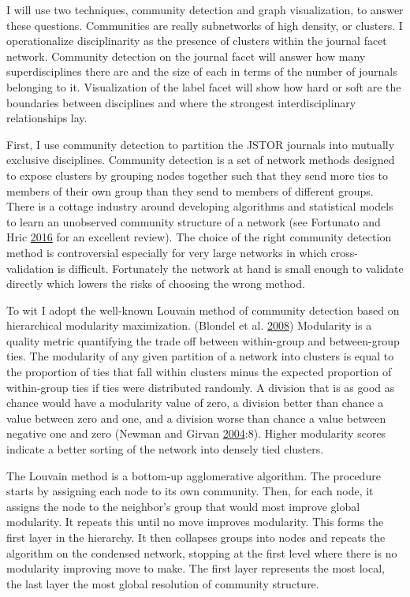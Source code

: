 \documentclass[]{book}
\theoremstyle{definition}
\theoremstyle{definition}
\theoremstyle{definition}
\theoremstyle{remark}
\begin{document}
I will use two techniques, community detection and graph visualization,
to answer these questions. Communities are really subnetworks of high
density, or clusters. I operationalize disciplinarity as the presence of
clusters within the journal facet network. Community detection on the
journal facet will answer how many superdisciplines there are and the
size of each in terms of the number of journals belonging to it.
Visualization of the label facet will show how hard or soft are the
boundaries between disciplines and where the strongest interdisciplinary
relationships lay.

First, I use community detection to partition the JSTOR journals into
mutually exclusive disciplines. Community detection is a set of network
methods designed to expose clusters by grouping nodes together such that
they send more ties to members of their own group than they send to
members of different groups. There is a cottage industry around
developing algorithms and statistical models to learn an unobserved
community structure of a network (see Fortunato and Hric
\protect\hyperlink{ref-Fortunato2016Community}{2016} for an excellent
review). The choice of the right community detection method is
controversial especially for very large networks in which
cross-validation is difficult. Fortunately the network at hand is small
enough to validate directly which lowers the risks of choosing the wrong
method.

To wit I adopt the well-known Louvain method of community detection
based on hierarchical modularity maximization. (Blondel et al.
\protect\hyperlink{ref-Blondel2008Fast}{2008}) Modularity is a quality
metric quantifying the trade off between within-group and between-group
ties. The modularity of any given partition of a network into clusters
is equal to the proportion of ties that fall within clusters minus the
expected proportion of within-group ties if ties were distributed
randomly. A division that is as good as chance would have a modularity
value of zero, a division better than chance a value between zero and
one, and a division worse than chance a value between negative one and
zero (Newman and Girvan
\protect\hyperlink{ref-Newman2004Finding}{2004}:8). Higher modularity
scores indicate a better sorting of the network into densely tied
clusters.

The Louvain method is a bottom-up agglomerative algorithm. The procedure
starts by assigning each node to its own community. Then, for each node,
it assigns the node to the neighbor's group that would most improve
global modularity. It repeats this until no move improves modularity.
This forms the first layer in the hierarchy. It then collapses groups
into nodes and repeats the algorithm on the condensed network, stopping
at the first level where there is no modularity improving move to make.
The first layer represents the most local, the last layer the most
global resolution of community structure.
\end{document}
